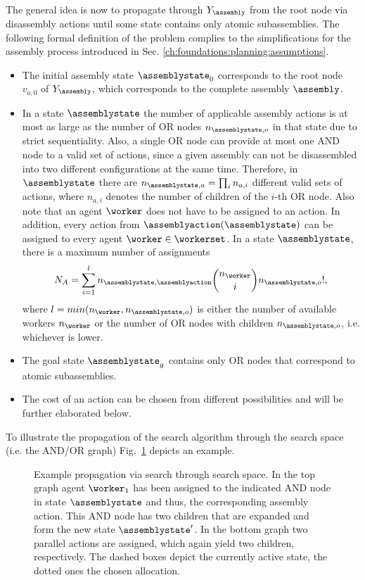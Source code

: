 The general idea is now to propagate through $Y_\assembly$ from the root node via disassembly actions until some state contains only atomic subassemblies.
The following formal definition of the problem complies to the simplifications for the assembly process introduced in Sec. \ref{ch:foundations:planning:assumptions}.
\begin{itemize}
\item The initial assembly state $\assemblystate_0$ corresponds to the root node $v_{o,0}$ of $Y_\assembly$, which corresponds to the complete assembly $\assembly$.
\item In a state $\assemblystate$ the number of applicable assembly actions is at most as large as the number of OR nodes $n_{\assemblystate,o}$ in that state due to strict sequentiality.
Also, a single OR node can provide at most one AND node to a valid set of actions, since a given assembly can not be disassembled into two different configurations at the same time.
Therefore, in $\assemblystate$ there are $n_{\assemblystate,a}=\prod_i n_{a,i}$ different valid sets of actions, where $n_{a,i}$ denotes the number of children of the $i$-th OR node.
Also note that an agent $\worker$ does not have to be assigned to an action.
In addition, every action from $\assemblyaction(\assemblystate)$ can be assigned to every agent $\worker \in \workerset$.
In a state $\assemblystate$, there is a maximum number of assignments
\begin{equation*}
N_A=\sum_{i=1}^{l} n_{\assemblystate,\assemblyaction}\binom{n_\worker}{i} n_{\assemblystate,o}!\text{,}
\end{equation*}
where $l=min(n_\worker,n_{\assemblystate,o})$ is either the number of available workers $n_\worker$ or the number of OR nodes with children $n_{\assemblystate,o}$, i.e. whichever is lower.
\item The goal state $\assemblystate_g$ contains only OR nodes that correspond to atomic subassemblies.
\item The cost of an action can be chosen from different possibilities and will be further elaborated below.
\end{itemize}
To illustrate the propagation of the search algorithm through the search space (i.e. the AND/OR graph) Fig.~\ref{fig:applications:planner:propagation} depicts an example. 

\begin{figure}[ht!]
\begin{center}

\caption{Example propagation via search through search space.
In the top graph agent $\worker_1$ has been assigned to the indicated AND node in state $\assemblystate$ and thus, the corresponding assembly action.
This AND node has two children that are expanded and form the new state $\assemblystate^\prime$.
In the bottom graph two parallel actions are assigned, which again yield two children, respectively.
The dashed boxes depict the currently active state, the dotted ones the chosen allocation.}
\label{fig:applications:planner:propagation}
\end{center}
\end{figure}


